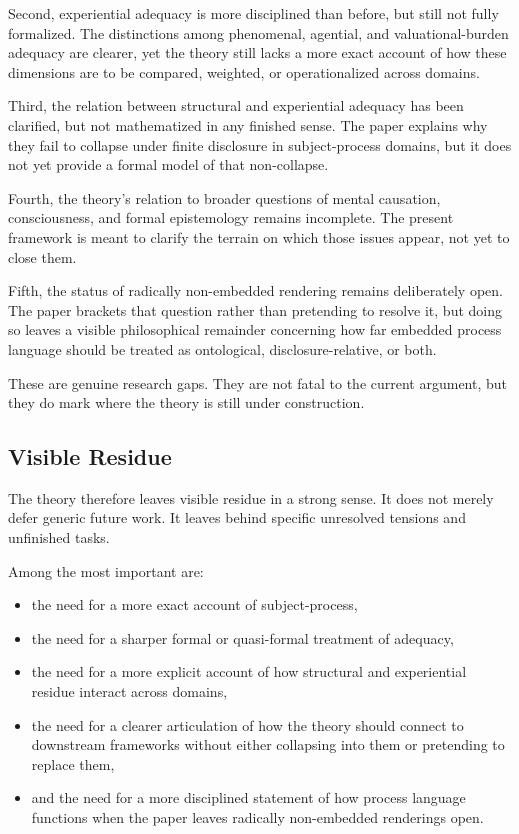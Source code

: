 \documentclass[11pt]{article}
\begin{document}
Second, experiential adequacy is more disciplined than before, but still not fully formalized. The distinctions among phenomenal, agential, and valuational-burden adequacy are clearer, yet the theory still lacks a more exact account of how these dimensions are to be compared, weighted, or operationalized across domains.

Third, the relation between structural and experiential adequacy has been clarified, but not mathematized in any finished sense. The paper explains why they fail to collapse under finite disclosure in subject-process domains, but it does not yet provide a formal model of that non-collapse.

Fourth, the theory's relation to broader questions of mental causation, consciousness, and formal epistemology remains incomplete. The present framework is meant to clarify the terrain on which those issues appear, not yet to close them.

Fifth, the status of radically non-embedded rendering remains deliberately open. The paper brackets that question rather than pretending to resolve it, but doing so leaves a visible philosophical remainder concerning how far embedded process language should be treated as ontological, disclosure-relative, or both.

These are genuine research gaps. They are not fatal to the current argument, but they do mark where the theory is still under construction.

\subsection{Visible Residue}

The theory therefore leaves visible residue in a strong sense. It does not merely defer generic future work. It leaves behind specific unresolved tensions and unfinished tasks.

Among the most important are:
\begin{itemize}
    \item the need for a more exact account of subject-process,
    \item the need for a sharper formal or quasi-formal treatment of adequacy,
    \item the need for a more explicit account of how structural and experiential residue interact across domains,
    \item the need for a clearer articulation of how the theory should connect to downstream frameworks without either collapsing into them or pretending to replace them,
    \item and the need for a more disciplined statement of how process language functions when the paper leaves radically non-embedded renderings open.
\end{itemize}
\end{document}
